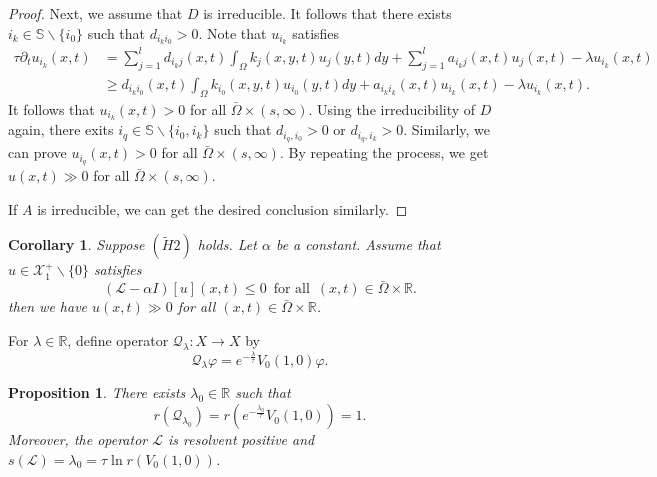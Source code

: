 \documentclass[11pt,reqno]{amsart}
\newtheorem{corollary}[theorem]{Corollary}
\newtheorem{proposition}[theorem]{Proposition}
\numberwithin{equation}{section}
\begin{document}
\begin{proof}
Next, we assume that $D$ is irreducible.
It follows that there exists $i_{k} \in \mathbb{S}\backslash\{ i_{0} \}$ such that $d_{i_{k}i_{0}}>0$. Note that $u_{i_{k}}$ satisfies
\begin{align*}
\tau \partial_{t} u_{i_{k}}(x,t) &=
\sum_{j=1}^{l} d_{i_{k}j}(x,t)\int_{\Omega}k_{j}(x,y,t)u_{j}(y,t)dy + \sum_{j=1}^{l}a_{i_{k}j}(x,t)u_{j}(x,t) - \lambda u_{i_{k}}(x,t) \\
&\geq
d_{i_{k}i_{0}}(x,t)\int_{\Omega}k_{i_{0}}(x,y,t)u_{i_{0}}(y,t)dy + a_{i_{k}i_{k}}(x,t)u_{i_{k}}(x,t) - \lambda u_{i_{k}}(x,t).
\end{align*}
It follows that $u_{i_{k}}(x,t)>0$ for all $\bar{\Omega}\times (s,\infty)$.
Using the irreducibility of $D$ again, there exits $i_{q}\in \mathbb{S} \backslash \{ i_{0},i_{k}\}$ such that $d_{i_{q},i_{0}}>0$ or $d_{i_{q},i_{k}} >0$. Similarly, we can prove $u_{i_{q}}(x,t)>0$ for all $\bar{\Omega}\times (s,\infty)$. By repeating the process, we get $u(x,t)\gg 0$ for all $\bar{\Omega}\times (s,\infty)$.

If $A$ is irreducible, we can get the desired conclusion similarly.
\end{proof}

\begin{corollary}\label{COR2.9}
Suppose $(\tilde{H}2)$ holds.
Let $\alpha$ be a constant. Assume that $u \in \mathcal{X}_{1}^{+} \backslash \{ 0 \}$ satisfies
\begin{equation*}
(\mathcal{L} - \alpha I)[u](x,t)\leq 0
\enspace \text{for all} \enspace (x,t)\in \bar{\Omega}\times \mathbb{R}.
\end{equation*}
then we have $ u(x,t) \gg 0 $ for all $(x,t)\in \bar{\Omega}\times \mathbb{R}$.
\end{corollary}


For $\lambda\in\mathbb{R}$, define operator $\mathcal{Q}_{\lambda} : X \to X$ by
\begin{equation*}
\mathcal{Q}_{\lambda} \varphi = e^{-\frac{\lambda}{\tau}} V_{0}(1,0)\varphi.
\end{equation*}

\begin{proposition}\label{PP2.10}
There exists $\lambda_{0}\in\mathbb{R}$ such that
\begin{equation*}
r(\mathcal{Q}_{\lambda_{0}})=r(e^{-\frac{\lambda_{0}}{\tau}}V_{0}(1,0) )=1.
\end{equation*}
Moreover, the operator $\mathcal{L}$ is  resolvent positive and $s(\mathcal{L})=\lambda_{0} = \tau \ln r(V_{0}(1,0))$.
\end{proposition}
\end{document}
